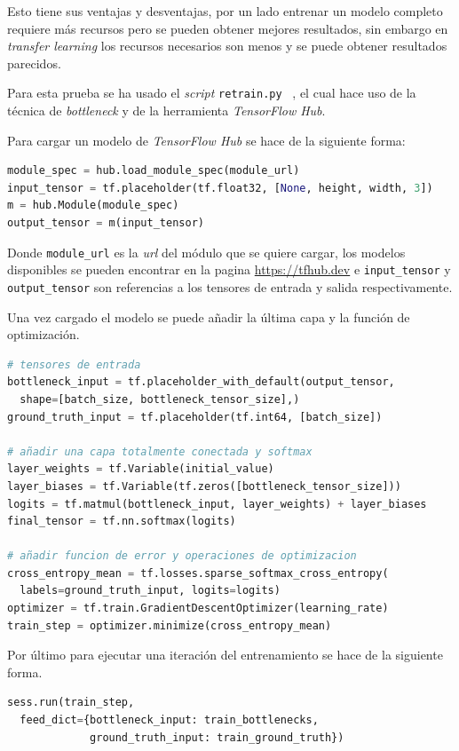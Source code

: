 \documentclass[12pt,a4paper]{article}
\begin{document}
Esto tiene sus ventajas y desventajas, por un lado entrenar un modelo completo requiere más recursos pero se pueden obtener mejores resultados, sin embargo en \textit{transfer learning} los recursos necesarios son menos y se puede obtener resultados parecidos.
\bigskip

Para esta prueba se ha usado el \textit{script} \texttt{retrain.py} ~\cite{retrainpy}, el cual hace uso de la técnica de \textit{bottleneck} y de la herramienta \textit{TensorFlow Hub}.
\bigskip

Para cargar un modelo de \textit{TensorFlow Hub} se hace de la siguiente forma:

\begin{lstlisting}[language=Python]
module_spec = hub.load_module_spec(module_url)
input_tensor = tf.placeholder(tf.float32, [None, height, width, 3])
m = hub.Module(module_spec)
output_tensor = m(input_tensor)
\end{lstlisting}

Donde \texttt{module\_url} es la \textit{url} del módulo que se quiere cargar, los modelos disponibles se pueden encontrar en la pagina \url{https://tfhub.dev} e \texttt{input\_tensor} y \texttt{output\_tensor} son referencias a los tensores de entrada y salida respectivamente.
\bigskip

Una vez cargado el modelo se puede añadir la última capa y la función de optimización.

\begin{lstlisting}[language=Python]
# tensores de entrada
bottleneck_input = tf.placeholder_with_default(output_tensor,
  shape=[batch_size, bottleneck_tensor_size],)
ground_truth_input = tf.placeholder(tf.int64, [batch_size])

# añadir una capa totalmente conectada y softmax
layer_weights = tf.Variable(initial_value)
layer_biases = tf.Variable(tf.zeros([bottleneck_tensor_size]))
logits = tf.matmul(bottleneck_input, layer_weights) + layer_biases
final_tensor = tf.nn.softmax(logits)

# añadir funcion de error y operaciones de optimizacion
cross_entropy_mean = tf.losses.sparse_softmax_cross_entropy(
  labels=ground_truth_input, logits=logits)
optimizer = tf.train.GradientDescentOptimizer(learning_rate)
train_step = optimizer.minimize(cross_entropy_mean)
\end{lstlisting}

Por último para ejecutar una iteración del entrenamiento se hace de la siguiente forma.

\begin{lstlisting}[language=Python]
sess.run(train_step,
  feed_dict={bottleneck_input: train_bottlenecks,
             ground_truth_input: train_ground_truth})
\end{lstlisting}
\end{document}
